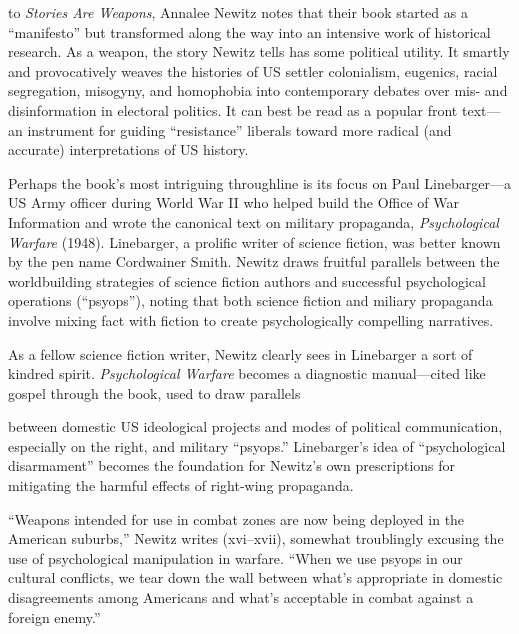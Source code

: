 \documentclass{tufte-handout}
\begin{document}
\begin{titlepage}
\vspace{0.2in}

 to \emph{Stories Are Weapons}, Annalee Newitz
notes that their book started as a ``manifesto'' but transformed along
the way into an intensive work of historical research. As a weapon, the
story Newitz tells has some political utility. It smartly and
provocatively weaves the histories of US settler colonialism, eugenics,
racial segregation, misogyny, and homophobia into contemporary debates
over mis- and disinformation in electoral politics. It can best be read
as a popular front text---an instrument for guiding ``resistance''
liberals toward more radical (and accurate) interpretations of US
history.

Perhaps the book's most intriguing throughline is its focus on Paul
Linebarger---a US Army officer during World War II who helped build the
Office of War Information and wrote the canonical text on military
propaganda, \emph{Psychological Warfare} (1948). Linebarger, a prolific
writer of science fiction, was better known by the pen name Cordwainer
Smith. Newitz draws fruitful parallels between the worldbuilding
strategies of science fiction authors and successful psychological
operations (``psyops''), noting that both science fiction and miliary
propaganda involve mixing fact with fiction to create psychologically
compelling narratives.

As a fellow science fiction writer, Newitz clearly sees in Linebarger a
sort of kindred spirit. \emph{Psychological Warfare} becomes a
diagnostic manual---cited like gospel through the book, used to draw
parallels 

\enlargethispage{2\baselineskip}

\vspace*{2em}



 \end{titlepage}


\noindent between domestic US ideological projects and modes of
political communication, especially on the right, and military
``psyops.'' Linebarger's idea of ``psychological disarmament'' becomes
the foundation for Newitz's own prescriptions for mitigating the harmful
effects of right-wing propaganda.

``Weapons intended for use in combat zones are now being deployed in the
American suburbs,'' Newitz writes (xvi--xvii), somewhat troublingly
excusing the use of psychological manipulation in warfare. ``When we use
psyops in our cultural conflicts, we tear down the wall between what's
appropriate in domestic disagreements among Americans and what's
acceptable in combat against a foreign enemy.''
\end{document}
